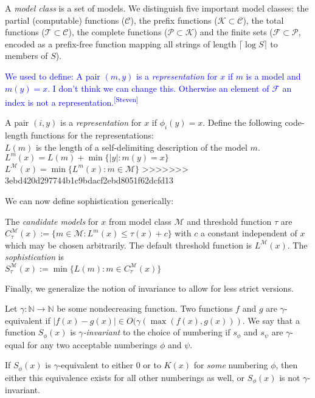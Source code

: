 \documentclass{style/llncs}
\newcommand{\M}{\mathscr M}
\newcommand{\C}{\mathscr C}
\newcommand{\T}{\mathscr T}
\newcommand{\F}{\mathscr F}
\renewcommand{\P}{\mathscr P}
\newcommand{\K}{\mathscr K}
\newcommand{\N}{\mathbb N}
\newcommand{\s}{S}
\newcommand{\sdr}[1]{\textcolor{blue}{\small #1\textsuperscript{[Steven]} }}
\begin{document}
\begin{definition} A \emph{model class} is a set of models. We distinguish five important model classes: the partial (computable) functions ($\C$), the prefix functions ($\K \subset \C$), the total functions ($\T \subset \C$), the complete functions ($\P \subset \K$) and the finite sets ($\F \subset \P$, encoded as a prefix-free function mapping all strings of length $\lceil\log S\rceil$ to members of $S$).
\end{definition}

\sdr{We used to define: A pair $(m,y)$ is a \emph{representation} for $x$ if $m$ is a model and $m(y)=x$. I don't think we can change this. Otherwise an element of $\F$ an index is not a representation.}

\begin{definition}[Representations]
A pair $(i,y)$ is a \emph{representation} for $x$ if $\phi_i(y)=x$.
Define the following code-length functions for the representations:\\
\-\hspace{1cm}$L(m)$ is the length of a self-delimiting description of the model $m$.\\ 
\-\hspace{1cm}$L^m(x)=L(m)+\min\{|y|:m(y)=x\}$\\
\-\hspace{1cm}$L^\M(x)=\min\{L^m(x):m\in\M\}$
>>>>>>> 3ebd420d297744b1c9bdacf2ebd8051f62dcfd13
\end{definition}
We can now define sophistication generically:
\begin{definition}[Sophistication]
The \emph{candidate models} for $x$ from model class $\M$ and threshold function $\tau$ are
$C^\M_\tau(x):=\{m\in\M:L^m(x)\le \tau(x) + c\}$
with $c$ a constant independent of $x$ which may be chosen arbitrarily. The default threshold function is $L^\M(x)$. The \emph{sophistication} is \\ 
\-\hspace{1cm}$\s_\tau^{\M}(x):=\min\{L(m):m\in C^\M_\tau(x)\}$\label{definition:sophistication}
\end{definition}
Finally, we generalize the notion of invariance to allow for less strict versions. 
\begin{definition}
Let $\gamma:\N\to \N$ be some nondecreasing function. Two functions $f$ and $g$ are $\gamma$-equivalent if $|f(x) - g(x)| \in O(\gamma(\max(f(x), g(x)))$. We say that a function $\s_\phi(x)$ is \emph{$\gamma$-invariant} to the choice of numbering if $s_\phi$ and $s_\psi$ are $\gamma$-equal for any two acceptable numberings $\phi$ and $\psi$. 
\end{definition}
\begin{lemma}\label{lem:broken}
If $\s_\phi(x)$ is $\gamma$-equivalent to either $0$ or to $K(x)$ for \emph{some} numbering $\phi$, then either this equivalence exists for all other numberings as well, or $\s_\phi(x)$ is not $\gamma$-invariant.
\end{lemma}
\end{document}

